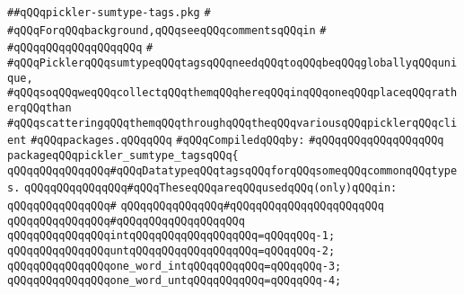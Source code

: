 \label{src/lib/compiler/src/library/pickler-sumtype-tags.pkg}
\verb|##qQQqpickler-sumtype-tags.pkg|\newline
\verb|#|\newline
\verb|#qQQqForqQQqbackground,qQQqseeqQQqcommentsqQQqin|\newline
\verb|#|\newline
\verb|#qQQqqQQqqQQqqQQqqQQq|\newline
\verb|#|\newline
\verb|#qQQqPicklerqQQqsumtypeqQQqtagsqQQqneedqQQqtoqQQqbeqQQqgloballyqQQqunique,|\newline
\verb|#qQQqsoqQQqweqQQqcollectqQQqthemqQQqhereqQQqinqQQqoneqQQqplaceqQQqratherqQQqthan|\newline
\verb|#qQQqscatteringqQQqthemqQQqthroughqQQqtheqQQqvariousqQQqpicklerqQQqclient|\newline
\verb|#qQQqpackages.qQQqqQQq|\newline
\newline
\verb|#qQQqCompiledqQQqby:|\newline
\verb|#qQQqqQQqqQQqqQQqqQQq|\newline
\newline
\newline
\verb|packageqQQqpickler_sumtype_tagsqQQq{|\newline
\newline
\verb|qQQqqQQqqQQqqQQq#qQQqDatatypeqQQqtagsqQQqforqQQqsomeqQQqcommonqQQqtypes.|\newline
\verb|qQQqqQQqqQQqqQQq#qQQqTheseqQQqareqQQqusedqQQq(only)qQQqin:|\newline
\verb|qQQqqQQqqQQqqQQq#|\newline
\verb|qQQqqQQqqQQqqQQq#qQQqqQQqqQQqqQQqqQQq|\verb|qQQq|\newline
\verb|qQQqqQQqqQQqqQQq#qQQqqQQqqQQqqQQqqQQq|\newline
\verb|qQQqqQQqqQQqqQQqintqQQqqQQqqQQqqQQqqQQq=qQQqqQQq-1;|\newline
\verb|qQQqqQQqqQQqqQQquntqQQqqQQqqQQqqQQqqQQq=qQQqqQQq-2;|\newline
\verb|qQQqqQQqqQQqqQQqone_word_intqQQqqQQqqQQq=qQQqqQQq-3;|\newline
\verb|qQQqqQQqqQQqqQQqone_word_untqQQqqQQqqQQq=qQQqqQQq-4;|\newline
